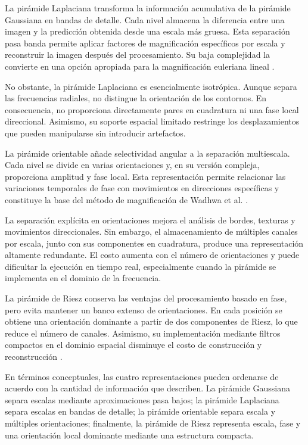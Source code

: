 La pirámide Laplaciana transforma la información acumulativa de la pirámide Gaussiana en bandas de detalle. Cada nivel almacena la diferencia entre una imagen y la predicción obtenida desde una escala más gruesa. Esta separación pasa banda permite aplicar factores de magnificación específicos por escala y reconstruir la imagen después del procesamiento. Su baja complejidad la convierte en una opción apropiada para la magnificación euleriana lineal \cite{wu2012eulerian}.

No obstante, la pirámide Laplaciana es esencialmente isotrópica. Aunque separa las frecuencias radiales, no distingue la orientación de los contornos. En consecuencia, no proporciona directamente pares en cuadratura ni una fase local direccional. Asimismo, su soporte espacial limitado restringe los desplazamientos que pueden manipularse sin introducir artefactos.

La pirámide orientable añade selectividad angular a la separación multiescala. Cada nivel se divide en varias orientaciones y, en su versión compleja, proporciona amplitud y fase local. Esta representación permite relacionar las variaciones temporales de fase con movimientos en direcciones específicas y constituye la base del método de magnificación de Wadhwa et al. \cite{wadhwa2013phase}.

La separación explícita en orientaciones mejora el análisis de bordes, texturas y movimientos direccionales. Sin embargo, el almacenamiento de múltiples canales por escala, junto con sus componentes en cuadratura, produce una representación altamente redundante. El costo aumenta con el número de orientaciones y puede dificultar la ejecución en tiempo real, especialmente cuando la pirámide se implementa en el dominio de la frecuencia.

La pirámide de Riesz conserva las ventajas del procesamiento basado en fase, pero evita mantener un banco extenso de orientaciones. En cada posición se obtiene una orientación dominante a partir de dos componentes de Riesz, lo que reduce el número de canales. Asimismo, su implementación mediante filtros compactos en el dominio espacial disminuye el costo de construcción y reconstrucción \cite{wadhwa2014riesz}.

En términos conceptuales, las cuatro representaciones pueden ordenarse de acuerdo con la cantidad de información que describen. La pirámide Gaussiana separa escalas mediante aproximaciones pasa bajos; la pirámide Laplaciana separa escalas en bandas de detalle; la pirámide orientable separa escala y múltiples orientaciones; finalmente, la pirámide de Riesz representa escala, fase y una orientación local dominante mediante una estructura compacta.

